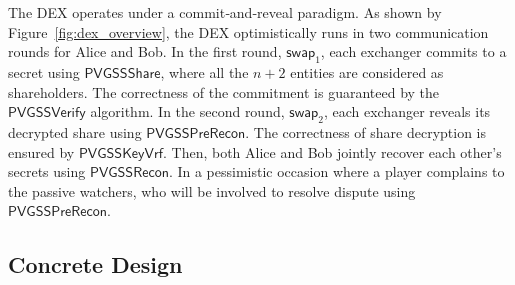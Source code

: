 \documentclass[runningheads]{llncs}
\newcommand{\pvgssShare}{\mathsf{PVGSSShare}}
\newcommand{\pvgssVerify}{\mathsf{PVGSSVerify}}
\newcommand{\pvgssPreRecon}{\mathsf{PVGSSPreRecon}}
\newcommand{\pvgssKeyVrf}{\mathsf{PVGSSKeyVrf}}
\newcommand{\pvgssRecon}{\mathsf{PVGSSRecon}}
\begin{document}
The DEX operates under a commit‑and‑reveal paradigm.
As shown by Figure~\ref{fig:dex_overview}, the DEX optimistically runs in two communication rounds for Alice and Bob.
In the first round, $\mathsf{swap}_1$, each exchanger commits to a secret using $\pvgssShare$, where all the $n+2$ entities are considered as shareholders.
The correctness of the commitment is guaranteed by the $\pvgssVerify$ algorithm.
In the second round, $\mathsf{swap}_2$, each exchanger reveals its decrypted share using $\pvgssPreRecon$.
The correctness of share decryption is ensured by $\pvgssKeyVrf$. Then, both Alice and Bob jointly recover each other's secrets using $\pvgssRecon$.
In a pessimistic occasion where a player complains to the passive watchers, who will be involved to resolve dispute using $\pvgssPreRecon$.



\subsection{Concrete Design}
\end{document}
